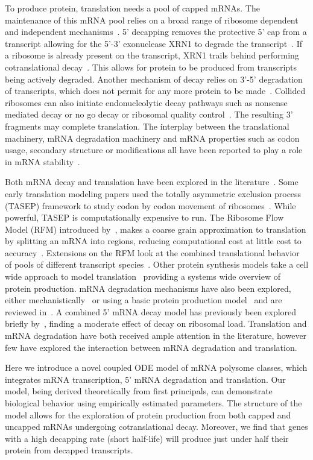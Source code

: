 \documentclass[10pt,letterpaper]{article}
\begin{document}
To produce protein, translation needs a pool of capped mRNAs. The maintenance of this mRNA pool relies on a broad range of ribosome dependent and independent mechanisms~\cite{RN3}. 5' decapping removes the protective 5' cap from a transcript allowing for the 5'-3' exonuclease XRN1 to degrade the transcript~\cite{RN3}. If a ribosome is already present on the transcript, XRN1 trails behind performing cotranslational decay~\cite{RN4}. This allows for protein to be produced from transcripts being actively degraded. Another mechanism of decay relies on 3'-5' degradation of transcripts, which does not permit for any more protein to be made~\cite{RN5}. Collided ribosomes can also initiate endonucleolytic decay pathways such as nonsense mediated decay or no go decay or ribosomal quality control~\cite{RN6,RN7}. The resulting 3' fragments may complete translation. The interplay between the translational machinery, mRNA degradation machinery and mRNA properties such as codon usage, secondary structure or modifications all have been reported to play a role in mRNA stability~\cite{RN8, RN9, RN10}.


Both mRNA decay and translation have been explored in the literature~\cite{RN11, RN12}. Some early translation modeling papers used the totally asymmetric exclusion process (TASEP) framework to study codon by codon movement of ribosomes~\cite{RN13,RN14}. While powerful, TASEP is computationally expensive to run. The Ribosome Flow Model (RFM) introduced by~\cite{RN15}, makes a coarse grain approximation to translation by splitting an mRNA into regions, reducing computational cost at little cost to accuracy~\cite{RN15}. Extensions on the RFM look at the combined translational behavior of pools of different transcript species~\cite{RN16}. Other protein synthesis models take a cell wide approach to model translation~\cite{RN17} providing a systems wide overview of protein production. mRNA degradation mechanisms have also been explored, either mechanistically~\cite{RN18,RN19} or using a basic protein production model~\cite{RN20} and are reviewed in~\cite{RN21,RN22}. A combined 5' mRNA decay model has previously been explored briefly by~\cite{RN22}, finding a moderate effect of decay on ribosomal load. Translation and mRNA degradation have both received ample attention in the literature, however few have explored the interaction between mRNA degradation and translation.


Here we introduce a novel coupled ODE model of mRNA polysome classes, which integrates mRNA transcription, 5' mRNA degradation and translation. Our model, being derived theoretically from first principals, can demonstrate biological behavior using empirically estimated parameters. The structure of the model allows for the exploration of protein production from both capped and uncapped mRNAs undergoing cotranslational decay. Moreover, we find that genes with a high decapping rate (short half-life) will produce just under half their protein from decapped transcripts. 
\end{document}
